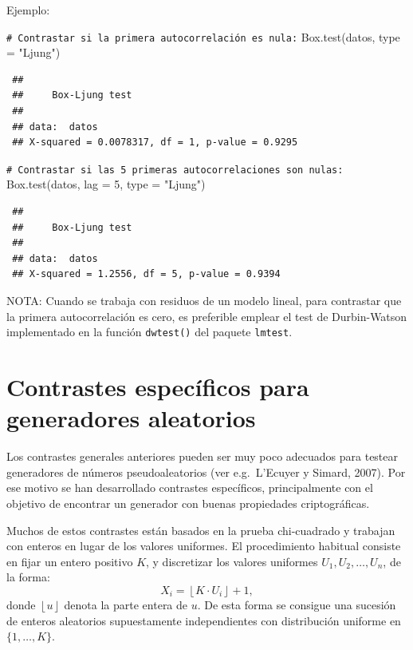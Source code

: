 \documentclass[
]{book}
\newenvironment{Shaded}{\begin{snugshade}}{\end{snugshade}}
\newcommand{\AttributeTok}[1]{\textcolor[rgb]{0.77,0.63,0.00}{#1}}
\newcommand{\CommentTok}[1]{\textcolor[rgb]{0.56,0.35,0.01}{\textit{#1}}}
\newcommand{\DecValTok}[1]{\textcolor[rgb]{0.00,0.00,0.81}{#1}}
\newcommand{\FunctionTok}[1]{\textcolor[rgb]{0.00,0.00,0.00}{#1}}
\newcommand{\NormalTok}[1]{#1}
\newcommand{\StringTok}[1]{\textcolor[rgb]{0.31,0.60,0.02}{#1}}
\theoremstyle{break}
\theoremstyle{nonumberplain}
\renewcommand{\CommentTok}[1]{\textcolor[rgb]{0.41,0.41,0.41}{\texttt{#1}}}
\begin{document}
Ejemplo:

\begin{Shaded}
\begin{Highlighting}[]
\CommentTok{\# Contrastar si la primera autocorrelación es nula:}
\FunctionTok{Box.test}\NormalTok{(datos, }\AttributeTok{type =} \StringTok{"Ljung"}\NormalTok{) }
\end{Highlighting}
\end{Shaded}

\begin{verbatim}
 ## 
 ##     Box-Ljung test
 ## 
 ## data:  datos
 ## X-squared = 0.0078317, df = 1, p-value = 0.9295
\end{verbatim}

\begin{Shaded}
\begin{Highlighting}[]
\CommentTok{\# Contrastar si las 5 primeras autocorrelaciones son nulas:}
\FunctionTok{Box.test}\NormalTok{(datos, }\AttributeTok{lag =} \DecValTok{5}\NormalTok{, }\AttributeTok{type =} \StringTok{"Ljung"}\NormalTok{) }
\end{Highlighting}
\end{Shaded}

\begin{verbatim}
 ## 
 ##     Box-Ljung test
 ## 
 ## data:  datos
 ## X-squared = 1.2556, df = 5, p-value = 0.9394
\end{verbatim}

NOTA: Cuando se trabaja con residuos de un modelo lineal, para contrastar que la primera autocorrelación es cero, es preferible emplear el test de
Durbin-Watson implementado en la función \texttt{dwtest()} del paquete \texttt{lmtest}.

\hypertarget{contrastes-especuxedficos-para-generadores-aleatorios}{%
\section{Contrastes específicos para generadores aleatorios}\label{contrastes-especuxedficos-para-generadores-aleatorios}}

Los contrastes generales anteriores pueden ser muy poco adecuados para testear generadores de números pseudoaleatorios (ver e.g.~L'Ecuyer y Simard, 2007). Por ese motivo se han desarrollado contrastes específicos, principalmente con el objetivo de encontrar un generador con buenas propiedades criptográficas.

Muchos de estos contrastes están basados en la prueba chi-cuadrado y trabajan con enteros en lugar de los valores uniformes. El procedimiento habitual consiste en fijar un entero positivo \(K\), y discretizar los valores uniformes \(U_{1},U_{2},\ldots,U_{n}\), de la forma:
\[X_i = \left\lfloor K\cdot U_{i}\right\rfloor + 1 ,\]
donde \(\left\lfloor u\right\rfloor\) denota la parte entera de \(u\).
De esta forma se consigue una sucesión de enteros aleatorios supuestamente independientes con distribución uniforme en \(\{1, \ldots, K\}\).
\end{document}
